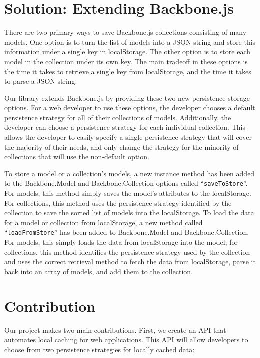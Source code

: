 \documentclass[12pt]{article}
\begin{document}
\section{Solution: Extending Backbone.js}

There are two primary ways to save Backbone.js collections consisting of many
models. One option is to turn the list of models into a JSON string and store
this information under a single key in localStorage. The other option is to
store each model in the collection under its own key. The main tradeoff in
these options is the time it takes to retrieve a single key from localStorage,
and the time it takes to parse a JSON string.

Our library extends Backbone.js by providing these two new persistence storage
options. For a web developer to use these options, the developer chooses a
default persistence strategy for all of their collections of models.
Additionally, the developer can choose a persistence strategy for each
individual collection. This allows the developer to easily specify a single
persistence strategy that will cover the majority of their needs, and only
change the strategy for the minority of collections that will use the
non-default option.

To store a model or a collection's models, a new instance method has been added
to the Backbone.Model and Backbone.Collection options called
``\verb=saveToStore=''. For models, this method simply saves the model's
attributes to the localStorage. For collections, this method uses the
persistence strategy identified by the collection to save the sorted list of
models into the localStorage. To load the data for a model or collection from
localStorage, a new method called ``\verb=loadFromStore='' has been added to
Backbone.Model and Backbone.Collection. For models, this simply loads the data
from localStorage into the model; for collections, this method identifies the
persistence strategy used by the collection and uses the correct retrieval
method to fetch the data from localStorage, parse it back into an array of
models, and add them to the collection.

\section{Contribution}

Our project makes two main contributions. First, we create an API that
automates local caching for web applications. This API will allow developers to
choose from two persistence strategies for locally cached data:
\end{document}

